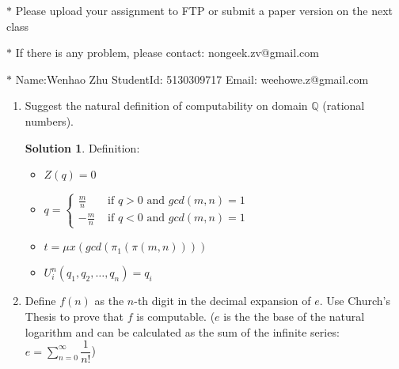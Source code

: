 \documentclass[12pt,a4paper]{article}
\theoremstyle{definition}
\newtheorem*{solution}{Solution}
\numberwithin{equation}{section}
\numberwithin{figure}{section}
\begin{document}
\noindent{}
\begin{center}
\footnotesize{\color{red}$*$ Please upload your assignment to FTP or submit a paper version on the next class}

\footnotesize{\color{red}$*$ If there is any problem, please contact: nongeek.zv@gmail.com }

\footnotesize{\color{blue}$*$ Name:Wenhao Zhu \quad StudentId: 5130309717 \quad Email: weehowe.z@gmail.com}
\end{center}


\begin{enumerate}%

  \item Suggest the natural definition of computability on domain $\mathbb{Q}$ (rational numbers).
  
    \begin{solution}
        Definition:
        \begin{itemize}
            \item $Z(q) = 0$
            
            \item $q=\left\{\begin{array}{ll}
            \frac{m}{n} & \mbox{ if } q > 0 \mbox{ and }  gcd(m,n)=1\\
       -\frac{m}{n} & \mbox{ if } q < 0 \mbox{ and }  gcd(m,n)=1
        \end{array}\right.$
        
            \item $t = \mu x(gcd(\pi_1(\pi(m,n))))$
            
            \item $U_i^n (q_1,q_2, \dots, q_n)= q_i$
        \end{itemize}
      \end{solution}

 \item Define $f(n)$ as the $n$-th digit in the decimal expansion of $e$. Use Church's Thesis to prove that $f$ is computable. ($e$ is the the base of the natural logarithm and can be calculated as the sum of the infinite series: $e = \sum\limits_{n=0}^{\infty}\dfrac{1}{n!}$)


\end{enumerate}
\end{document}
